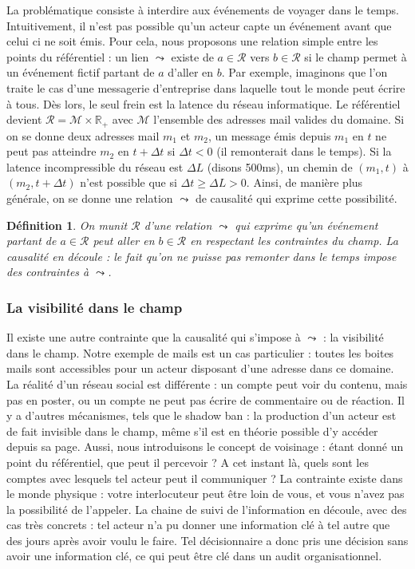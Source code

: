 \documentclass[11pt]{article}
\newtheorem{definition}{Définition}[section]
\begin{document}
				La problématique consiste à interdire aux événements de voyager dans le temps. Intuitivement, il n'est pas possible qu'un acteur capte un événement avant que celui ci ne soit émis. Pour cela, nous proposons une relation simple entre les points du référentiel : un lien $\leadsto$ existe de $a \in \mathcal{R}$ vers $b \in \mathcal{R}$ si le champ permet à un événement fictif partant de $a$ d'aller en $b$. Par exemple, imaginons que l'on traite le cas d'une messagerie d'entreprise dans laquelle tout le monde peut écrire à tous. Dès lors, le seul frein est la latence du réseau informatique. Le référentiel devient $\mathcal{R} = \mathcal{M} \times \mathbb{R}_+$ avec $\mathcal{M}$ l'ensemble des adresses mail valides du domaine. Si on se donne deux adresses mail $m_1$ et $m_2$, un message émis depuis $m_1$ en $t$ ne peut pas atteindre $m_2$ en $t+\Delta t$ si $\Delta t < 0$ (il remonterait dans le temps). Si la latence incompressible du réseau est $\Delta L$ (disons 500ms), un chemin de $(m_1,t)$ à $(m_2,t+\Delta t)$ n'est possible que si $\Delta t \ge \Delta L > 0$. Ainsi, de manière plus générale, on se donne une relation $\leadsto$ de causalité qui exprime cette possibilité. 
				
				\begin{definition}
					On munit $\mathcal{R}$ d'une relation $\leadsto$ qui exprime qu'un événement partant de $a \in \mathcal{R}$ peut aller en $b \in \mathcal{R}$ en respectant les contraintes du champ. La causalité en découle : le fait qu'on ne puisse pas remonter dans le temps impose des contraintes à $\leadsto$. 
				\end{definition}
			
			\subsubsection*{La visibilité dans le champ}
			
				Il existe une autre contrainte que la causalité qui s'impose à $\leadsto$ : la visibilité dans le champ. Notre exemple de mails est un cas particulier : toutes les boites mails sont accessibles pour un acteur disposant d'une adresse dans ce domaine. La réalité d'un réseau social est différente : un compte peut voir du contenu, mais pas en poster, ou un compte ne peut pas écrire de commentaire ou de réaction. Il y a d'autres mécanismes, tels que le \og{}shadow ban\fg{} : la production d'un acteur est de fait invisible dans le champ, même s'il est en théorie possible d'y accéder depuis sa page. Aussi, nous introduisons le concept de voisinage : étant donné un point du référentiel, que peut il percevoir ? A cet instant là, quels sont les comptes avec lesquels tel acteur peut il communiquer ? La contrainte existe dans le monde physique : votre interlocuteur peut être loin de vous, et vous n'avez pas la possibilité de l'appeler. La chaine de suivi de l'information en découle, avec des cas très concrets : tel acteur n'a pu donner une information clé à tel autre que des jours après avoir voulu le faire. Tel décisionnaire a donc pris une décision sans avoir une information clé, ce qui peut être clé dans un audit organisationnel. 
				
\end{document}
